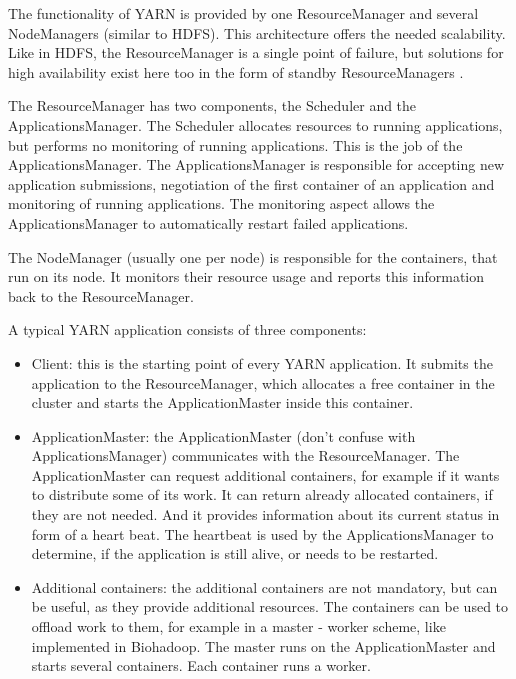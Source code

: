 The functionality of YARN is provided by one ResourceManager and several NodeManagers (similar to HDFS). This architecture offers the needed scalability. Like in HDFS, the ResourceManager is a single point of failure, but solutions for high availability exist here too in the form of standby ResourceManagers \cite{yarn-ha}.

The ResourceManager has two components, the Scheduler and the ApplicationsManager. The Scheduler allocates resources to running applications, but performs no monitoring of running applications. This is the job of the ApplicationsManager. The ApplicationsManager is responsible for accepting new application submissions, negotiation of the first container of an application and monitoring of running applications. The monitoring aspect allows the ApplicationsManager to automatically restart failed applications.

The NodeManager (usually one per node) is responsible for the containers, that run on its node. It monitors their resource usage and reports this information back to the ResourceManager.

A typical YARN application consists of three components:

\begin{itemize}
  \item Client: this is the starting point of every YARN application. It submits the application to the ResourceManager, which allocates a free container in the cluster and starts the ApplicationMaster inside this container.
  \item ApplicationMaster: the ApplicationMaster (don't confuse with ApplicationsManager) communicates with the ResourceManager. The ApplicationMaster can request additional containers, for example if it wants to distribute some of its work. It can return already allocated containers, if they are not needed. And it provides information about its current status in form of a heart beat. The heartbeat is used by the ApplicationsManager to determine, if the application is still alive, or needs to be restarted.
  \item Additional containers: the additional containers are not mandatory, but can be useful, as they provide additional resources. The containers can be used to offload work to them, for example in a master - worker scheme, like implemented in Biohadoop. The master runs on the ApplicationMaster and starts several containers. Each container runs a worker.
\end{itemize}

